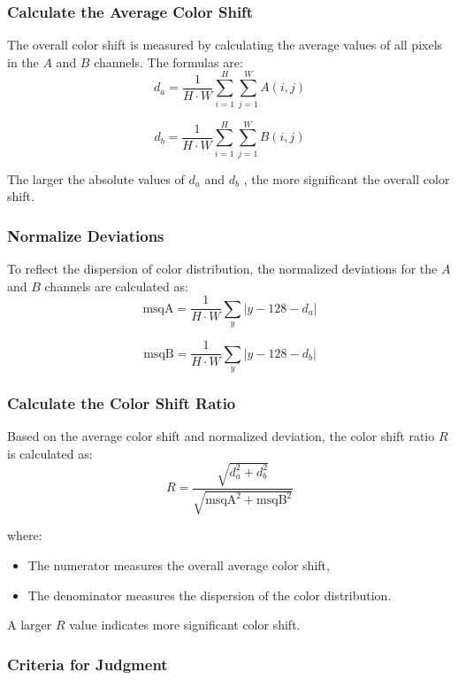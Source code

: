 \documentclass[withoutpreface,bwprint]{cumcmthesis}
\begin{document}
\subsubsection{Calculate the Average Color Shift}

The overall color shift is measured by calculating the average values of all pixels in the \( A \) and \( B \) channels. The formulas are:
\[d_a = \frac{1}{H \cdot W} \sum_{i=1}^{H} \sum_{j=1}^{W} A(i, j)\]

\[d_b = \frac{1}{H \cdot W} \sum_{i=1}^{H} \sum_{j=1}^{W} B(i, j)\]

The larger the absolute values of $d_a$ and $d_b$ , the more significant the overall color shift.

\subsubsection{Normalize Deviations}

To reflect the dispersion of color distribution, the normalized deviations for the $A$ and $B$ channels are calculated as:
\[\text{msqA} = \frac{1}{H \cdot W} \sum_{y} |y - 128 - d_a|\]

\[\text{msqB} = \frac{1}{H \cdot W} \sum_{y} |y - 128 - d_b|\]


\subsubsection{Calculate the Color Shift Ratio}

Based on the average color shift and normalized deviation, the color shift ratio $R$ is calculated as:
\[ R = \frac{\sqrt{d_a^2 + d_b^2}}{\sqrt{\text{msqA}^2 + \text{msqB}^2}}\]

where:

\begin{itemize}[itemindent=2em]
    \item The numerator measures the overall average color shift,

    \item The denominator measures the dispersion of the color distribution.
\end{itemize}

A larger $R$ value indicates more significant color shift.

\subsubsection{Criteria for Judgment}
\end{document}
